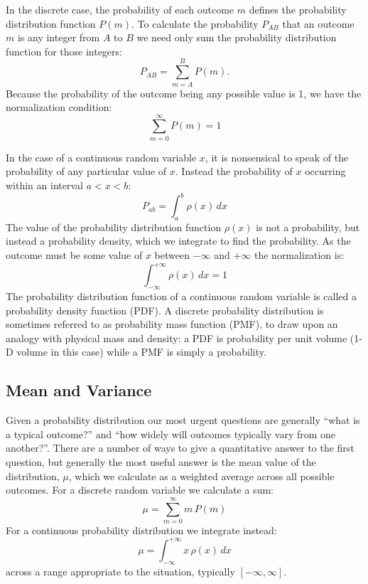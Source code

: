 \documentclass[12pt]{book}
\begin{document}
In the discrete case, the probability of each outcome $m$ defines the probability distribution function $P(m)$.  To calculate the probability $P_{AB}$ that an outcome $m$ is any integer from $A$ to $B$ we need only sum the probability distribution function for those integers:
\begin{displaymath}
P_{AB} = \sum_{m=A}^{B} P(m).
\end{displaymath}
Because the probability of the outcome being any possible value is 1, we have the normalization condition:
\begin{displaymath}
\sum_{m=0}^{\infty} P(m) = 1
\end{displaymath}

In the case of a continuous random variable $x$, it is nonsensical to speak of the probability of any particular value of $x$.  Instead the probability of $x$ occurring within an interval $a < x < b$:
\begin{displaymath}
P_{ab} = \int_{a}^{b} \rho(x) \, dx
\end{displaymath}
The value of the probability distribution function $\rho(x)$ is not a probability, but instead a probability density, which we integrate to find the probability.  As the outcome must be some value of $x$ between $-\infty$ and $+\infty$ the normalization is:
\begin{displaymath}
\int_{-\infty}^{+\infty} \rho(x) \, dx = 1
\end{displaymath}
The probability distribution function of a continuous random variable is called a probability density function (PDF).  A discrete probability distribution is sometimes referred to
as probability mass function (PMF), to draw upon an analogy with physical mass and density: a PDF is probability per unit volume (1-D volume in this case) while
a PMF is simply a probability.

\subsection{Mean and Variance}

Given a probability distribution our most urgent questions are generally ``what is a
typical outcome?'' and ``how widely will outcomes typically vary from
one another?''.  There are a number of ways to give a quantitative answer to the first question,
but generally the most useful answer is the mean value of the
distribution, $\mu$, which we calculate as a weighted average across
all possible outcomes.  For a discrete random variable we calculate a sum:
\begin{equation}
\label{eqn:mudis}
\mu = \sum_{m=0}^{\infty} m \, P(m)
\end{equation}
For a continuous probability distribution we integrate instead:
\begin{equation}
\mu = \int_{-\infty}^{+\infty} x \, \rho(x) \, dx 
\end{equation}
across a range appropriate to the situation, typically $[-\infty,\infty]$.
\end{document}

